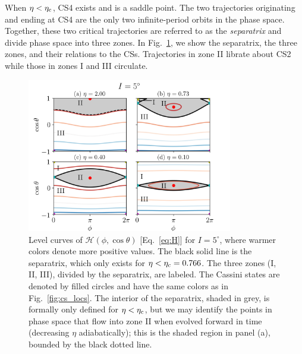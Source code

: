 \documentclass[
        fleqn,
        usenatbib,
    ]{mnras}
\newcommand*{\p}[1]{\left(#1\right)}
\begin{document}
When $\eta < \eta_{\rm c}$, CS4 exists and is a saddle point. The two
trajectories originating and ending at CS4 are the only two infinite-period
orbits in the phase space. Together, these two critical trajectories are
referred to as the \emph{separatrix} and divide phase space into three zones. In
Fig.~\ref{fig:eq_1contours}, we show the separatrix, the three zones, and their
relations to the CSs. Trajectories in zone II librate about CS2 while those in
zones I and III circulate.
\begin{figure}
    \centering
    \includegraphics[width=0.8\textwidth]{plots_diskdisp/1contours_flip.png}
    \caption{Level curves of $\mathcal{H}\p{\phi, \cos \theta}$
    [Eq.~\eqref{eq:H}] for $I = 5^\circ$, where warmer colors denote more
    positive values. The black solid line is the separatrix, which only exists
    for $\eta < \eta_{\rm c} = 0.766$. The three zones (I, II, III), divided by
    the separatrix, are labeled. The Cassini states are denoted by filled
    circles and have the same colors as in Fig.~\ref{fig:cs_locs}. The interior
    of the separatrix, shaded in grey, is formally only defined for $\eta <
    \eta_{\rm c}$, but we may identify the points in phase space that flow into
    zone II when evolved forward in time (decreasing $\eta$ adiabatically); this
    is the shaded region in panel (a), bounded by the black dotted
    line.}\label{fig:eq_1contours}
\end{figure}
\end{document}
